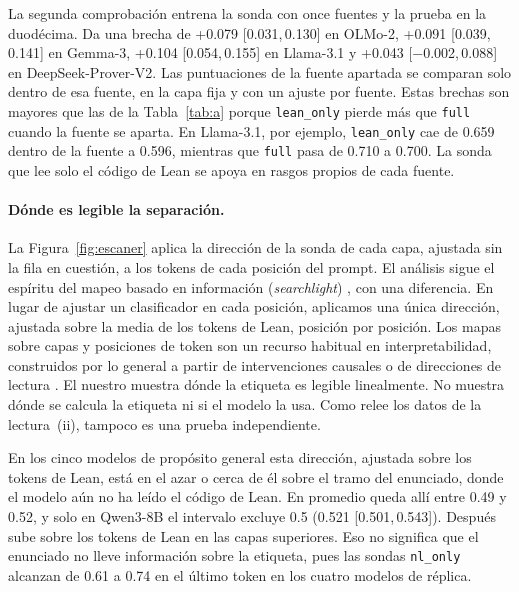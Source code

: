\documentclass[10pt]{article}
\newcommand{\vr}[1]{\texttt{#1}}
\newcommand{\ic}[2]{[#1,\,#2]}
\begin{document}
La segunda comprobación entrena la sonda con once fuentes y la prueba en la duodécima. Da una brecha de +0.079
\ic{0.031}{0.130} en OLMo-2, +0.091 \ic{0.039}{0.141} en Gemma-3, +0.104 \ic{0.054}{0.155} en Llama-3.1 y +0.043
\ic{−0.002}{0.088} en DeepSeek-Prover-V2. Las puntuaciones de la fuente apartada se comparan solo dentro de esa
fuente, en la capa fija y con un ajuste por fuente. Estas brechas son mayores que las de la Tabla~\ref{tab:a}
porque \vr{lean\_only} pierde más que \vr{full} cuando la fuente se aparta. En Llama-3.1, por ejemplo,
\vr{lean\_only} cae de 0.659 dentro de la fuente a 0.596, mientras que \vr{full} pasa de 0.710 a 0.700. La sonda
que lee solo el código de Lean se apoya en rasgos propios de cada fuente.

\paragraph{Dónde es legible la separación.}
La Figura~\ref{fig:escaner} aplica la dirección de la sonda de cada capa, ajustada sin la fila en cuestión, a los
tokens de cada posición del prompt. El análisis sigue el espíritu del mapeo basado en información (\emph{searchlight})
\citep{searchlight}, con una diferencia. En lugar de ajustar un clasificador en cada posición, aplicamos una única
dirección, ajustada sobre la media de los tokens de Lean, posición por posición. Los mapas sobre capas y posiciones
de token son un recurso habitual en interpretabilidad, construidos por lo general a partir de intervenciones
causales \citep{meng2022rome,geometry} o de direcciones de lectura \citep{zou2023repe}. El nuestro muestra dónde la
etiqueta es legible linealmente. No muestra dónde se calcula la etiqueta ni si el modelo la usa. Como relee los
datos de la lectura~(ii), tampoco es una prueba independiente.

En los cinco modelos de propósito general esta dirección, ajustada sobre los tokens de Lean, está en el azar o cerca
de él sobre el tramo del enunciado, donde el modelo aún no ha leído el código de Lean. En promedio queda allí entre 0.49 y 0.52, y solo en Qwen3-8B el intervalo excluye 0.5 (0.521 \ic{0.501}{0.543}). Después sube sobre los tokens de Lean en las
capas superiores. Eso no significa que el enunciado no lleve información sobre la etiqueta, pues las sondas
\vr{nl\_only} alcanzan de 0.61 a 0.74 en el último token en los cuatro modelos de réplica.
\end{document}
